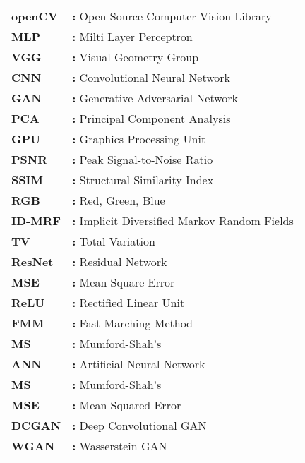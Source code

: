 \hspace{-3mm}

\begin{tabular}{ p{2cm} l }
    {\bf{openCV}} & {\bf:} Open Source Computer Vision Library\\
    {\bf{MLP}} & {\bf:} Milti Layer Perceptron\\
    {\bf{VGG}} & {\bf:} Visual Geometry Group\\
    {\bf{CNN}} & {\bf:} Convolutional Neural Network\\
    {\bf{GAN}} & {\bf:} Generative Adversarial Network\\
    {\bf{PCA}} & {\bf:} Principal Component Analysis\\
    {\bf{GPU}} & {\bf:} Graphics Processing Unit\\
    {\bf{PSNR}} & {\bf:} Peak Signal-to-Noise Ratio\\
    {\bf{SSIM}} & {\bf:} Structural Similarity Index\\
    {\bf{RGB}} & {\bf:} Red, Green, Blue\\
    {\bf{ID-MRF}} & {\bf:} Implicit Diversified Markov Random Fields\\
    {\bf{TV}} & {\bf:} Total Variation\\
    {\bf{ResNet}} & {\bf:} Residual Network\\
    {\bf{MSE}} & {\bf:} Mean Square Error\\
    {\bf{ReLU}} & {\bf:} Rectified Linear Unit\\
    {\bf{FMM}} & {\bf:} Fast Marching Method\\
    {\bf{MS}} & {\bf:} Mumford-Shah's\\
    {\bf{ANN}} & {\bf:} Artificial Neural Network\\
    {\bf{MS}} & {\bf:} Mumford-Shah's\\
    {\bf{MSE}} & {\bf:} Mean Squared Error\\
    {\bf{DCGAN}} & {\bf:} Deep Convolutional GAN\\
    {\bf{WGAN}} & {\bf:} Wasserstein GAN\\
\end{tabular}

